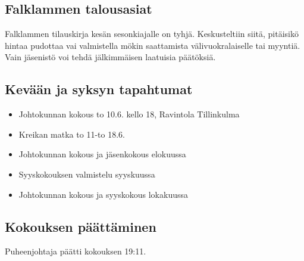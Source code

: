 \documentclass[a4paper,12pt]{article}
\begin{document}
\subsection{Falklammen talousasiat}
Falklammen tilauskirja kesän sesonkiajalle on tyhjä. Keskusteltiin siitä, pitäisikö hintaa pudottaa vai valmistella mökin saattamista välivuokralaiselle tai myyntiä. Vain jäsenistö voi tehdä jälkimmäisen laatuisia päätöksiä.
\subsection{Kevään ja syksyn tapahtumat}
\begin{itemize}
\item{Johtokunnan kokous} to 10.6. kello 18, Ravintola Tillinkulma
\item{Kreikan matka} to 11-to 18.6.
\item{Johtokunnan kokous ja jäsenkokous} elokuussa
\item{Syyskokouksen valmistelu} syyskuussa
\item{Johtokunnan kokous ja syyskokous} lokakuussa
\end{itemize}
\subsection{Kokouksen päättäminen}
Puheenjohtaja päätti kokouksen 19:11.
\end{document}
